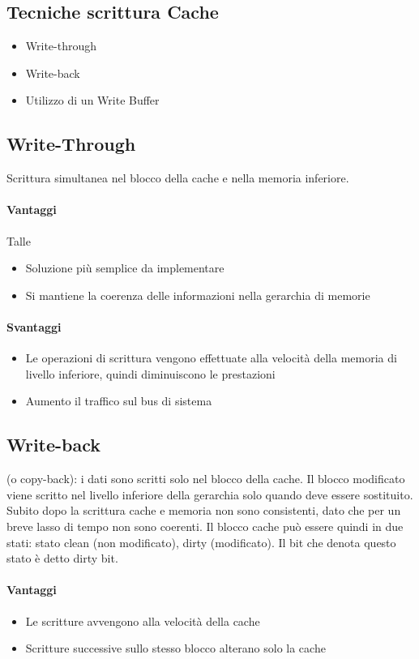 \documentclass[12pt, a4paper, openany]{book}
\begin{document}
\subsection*{Tecniche scrittura Cache}
\begin{itemize}
    \item Write-through
    \item Write-back
    \item Utilizzo di un Write Buffer
\end{itemize}

\subsection*{Write-Through} Scrittura simultanea nel blocco della cache e nella
memoria inferiore.
\paragraph*{Vantaggi} Talle
\begin{itemize}
    \item Soluzione più semplice da implementare
    \item Si mantiene la coerenza delle informazioni nella gerarchia di memorie
\end{itemize} 

\paragraph*{Svantaggi}
\begin{itemize}
    \item Le operazioni di scrittura vengono effettuate alla velocità della memoria
    di livello inferiore, quindi diminuiscono le prestazioni
    \item Aumento il traffico sul bus di sistema
\end{itemize}

\subsection*{Write-back} (o copy-back): i dati sono scritti solo nel blocco della cache.
Il blocco modificato viene scritto nel livello inferiore della gerarchia solo quando
deve essere sostituito. Subito dopo la scrittura cache e memoria non sono consistenti,
dato che per un breve lasso di tempo non sono coerenti.
Il blocco cache può essere quindi in due stati: stato clean (non modificato), dirty (modificato).
Il bit che denota questo stato è detto dirty bit.
\paragraph*{Vantaggi}
\begin{itemize}
    \item Le scritture avvengono alla velocità della cache
    \item Scritture successive sullo stesso blocco alterano solo la cache
\end{itemize}
\end{document}

